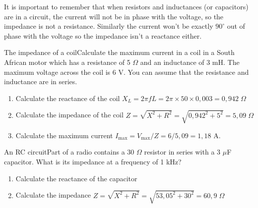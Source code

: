 
It is important to remember that when resistors and inductances (or capacitors) are in a circuit, the current will not be in phase with the voltage, so the impedance is not  a resistance.  Similarly the current won't be exactly $90^{\circ}$ out of phase with the voltage so the impedance isn't a reactance either.

\begin{wex}{The impedance of a coil}{Calculate the maximum current in a coil in a South African motor which has a resistance of 5 $\Omega$ and an inductance of 3 mH.  The maximum voltage across the coil is 6 V.  You can assume that the resistance and inductance are in series.}{\begin{enumerate} \item Calculate the reactance of the coil $X_{L} = 2 \pi f L = 2 \pi \times 50 \times 0,003 = 0,942 \; \Omega$ 
\item Calculate the impedance of the coil $Z = \sqrt{X^{2} + R^{2}} = \sqrt{ 0,942^{2} + 5^{2}} = 5,09 \; \Omega$
\item Calculate the maximum current $I_{\mathrm{max}} = V_{\mathrm{max}} / Z = 6 / 5,09 = 1,18$ A. \end{enumerate}}
\end{wex}

\begin{wex}{An RC circuit}{Part of a radio contains a 30 $\Omega$ resistor in series with a 3 $\mu$F capacitor.  What is its impedance at a frequency of 1 kHz?}{\begin{enumerate} \item 
Calculate the reactance of the capacitor

\item Calculate the impedance $Z = \sqrt{X^{2} + R^{2}} = \sqrt{ 53,05^{2} + 30^{2}} = 60,9 \; \Omega$  \end{enumerate}}
\end{wex}


